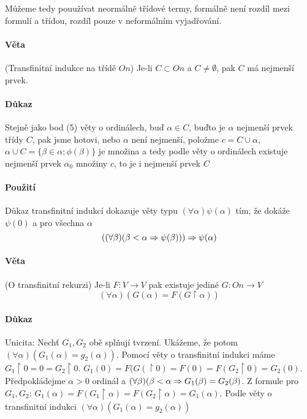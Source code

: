 \documentclass[a4paper,12pt,titlepage]{article}
\begin{document}
Můžeme tedy pouužívat neormálně třídové termy, formálně není rozdíl mezi formulí a třídou, rozdíl 
pouze v neformálním vyjadřování.


\paragraph{Věta}
(Transfinitní indukce na třídě $On$) Je-li $C \subset On$ a $C \ne \emptyset$, pak $C$ má nejmenší prvek.

\paragraph{Důkaz} Stejně jako bod (5) věty o ordinálech, buď $\alpha \in C$, buďto je $\alpha$ 
nejmenší prvek třídy $C$, pak jsme hotovi, nebo $\alpha$ není nejmenší, položme $c = C \cup \alpha$,
$\alpha \cup C = \{ \beta \in \alpha; \phi(\beta) \}$ je množina a tedy podle věty o ordinálech existuje
nejmenší prvek $\alpha_0$ množiny $c$, to je i nejmenší prvek $C$

\paragraph{Použití}
Důkaz transfinitní indukcí dokazuje věty typu $(\forall \alpha) \psi(\alpha)$ tím, že dokáže $\psi(0)$ 
a pro všechna $\alpha$ 
$$
	((\forall \beta)( \beta < \alpha \Rightarrow \psi(\beta))) \Rightarrow \psi(\alpha)
$$

\paragraph{Věta}
(O transfinitní rekurzi) Je-li $F: V \to V$ pak existuje jediné $G: On \to V$
$$
	(\forall \alpha)(G(\alpha) = F(G \upharpoonright\alpha))
$$

\paragraph{Důkaz}
Unicita: Nechť $G_1, G_2$ obě splňují tvrzení. Ukážeme, že potom $(\forall \alpha)(G_1(\alpha) = g_2(\alpha))$.
Pomocí věty o transfinitní indukci máme $G_1 \upharpoonright 0 = 0 = G_2 \upharpoonright 0$. $G_1(0) = F(G(
\upharpoonright 0) = F(0) = F(G_2 \upharpoonright 0) = G_2(0)$. Předpokládejme $\alpha > 0$ ordinál a 
$(\forall \beta)(\beta < \alpha \Rightarrow G_1(\beta) = G_2(\beta)$. Z formule pro $G_1, G_2$: $G_1(\alpha) = 
F (G_1 \upharpoonright \alpha) = F(G_2 \upharpoonright \alpha) = G_1(\alpha)$. Podle věty o transfinitní
indukci $(\forall \alpha)(G_1(\alpha) = g_2(\alpha))$
\end{document}
